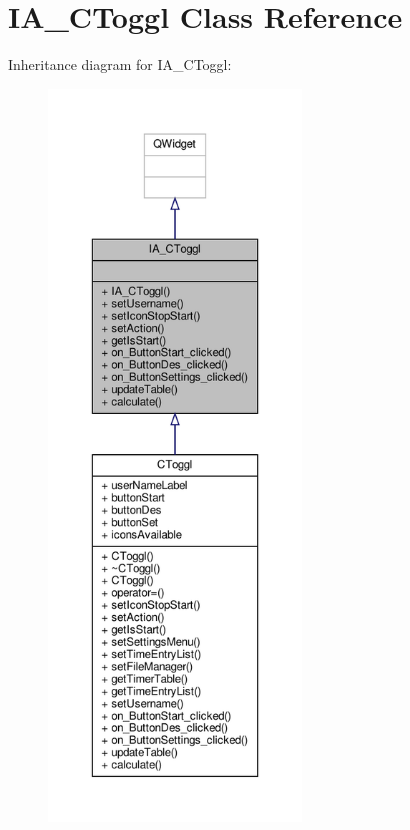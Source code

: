 \hypertarget{classIA__CToggl}{}\section{I\+A\+\_\+\+C\+Toggl Class Reference}
\label{classIA__CToggl}


Inheritance diagram for I\+A\+\_\+\+C\+Toggl\+:
\nopagebreak
\begin{figure}[H]
\begin{center}
\leavevmode
\includegraphics[height=550pt]{classIA__CToggl__inherit__graph}
\end{center}
\end{figure}


